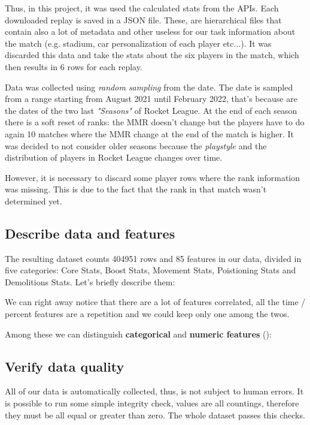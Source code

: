 Thus, in this project, it was used the calculated stats from the APIs. Each downloaded replay is saved in a JSON file. These, are hierarchical files that contain also a lot of metadata and other useless for our task information about the match (e.g. stadium, car personalization of each player etc...). It was discarded this data and take the stats about the six players in the match, which then results in 6 rows for each replay.

Data was collected using \textit{random sampling} from the date. The date is sampled from a range starting from August 2021 until February 2022, that's because are the dates of the two last \textit{"Seasons"} of Rocket League. At the end of each season there is a soft reset of ranks: the MMR doesn't change but the players have to do again 10 matches where the MMR change at the end of the match is higher.
It was decided to not consider older seasons because the \textit{playstyle} and the distribution of players in Rocket League changes over time.

However, it is necessary to discard some player rows where the rank information was missing. This is due to the fact that the rank in that match wasn't determined yet.

\subsection{Describe data and features}

The resulting dataset counts 404951 rows and 85 features in our data, divided in five categories: Core Stats, Boost Stats, Movement Stats, Poistioning Stats and Demolitions Stats. Let's briefly describe them:



We can right away notice that there are a lot of features correlated, all the time / percent features are a repetition and we could keep only one among the twos.

Among these we can distinguish \textbf{categorical} and \textbf{numeric features} ():



\subsection{Verify data quality}

All of our data is automatically collected, thus, is not subject to human errors.
It is possible to run some simple integrity check, values are all countings, therefore they must be all equal or greater than zero.
The whole dataset passes this checks.

